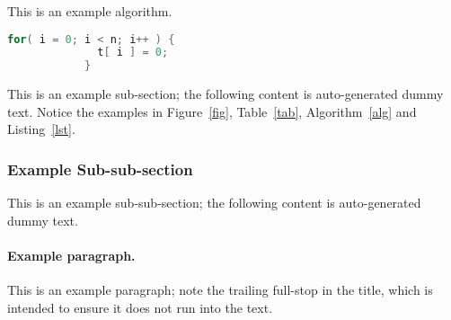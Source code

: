 		\begin{algorithm}[t]
			\caption{This is an example algorithm.}
			\label{alg}
		\end{algorithm}
		
		\begin{lstlisting}[float={t},caption={This is an example listing.},label={lst},language=C]
			for( i = 0; i < n; i++ ) {
			  t[ i ] = 0;
			}
		\end{lstlisting}
		
		This is an example sub-section;
		the following content is auto-generated dummy text.
		Notice the examples in Figure~\ref{fig}, Table~\ref{tab}, Algorithm~\ref{alg}
		and Listing~\ref{lst}.
		\lipsum
		
		\subsubsection{Example Sub-sub-section}
		
			This is an example sub-sub-section;
			the following content is auto-generated dummy text.
			\lipsum
			
			\paragraph{Example paragraph.}
			
				This is an example paragraph; note the trailing full-stop in the title,
				which is intended to ensure it does not run into the text.
			
